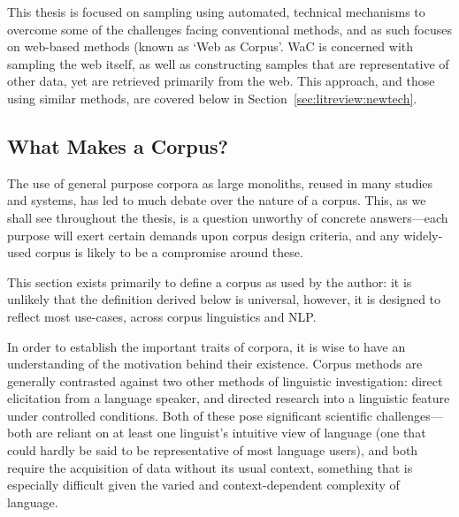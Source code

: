 
This thesis is focused on sampling using automated, technical mechanisms to overcome some of the challenges facing conventional methods, and as such focuses on web-based methods (known as `Web as Corpus'.  WaC is concerned with sampling the web itself, as well as constructing samples that are representative of other data, yet are retrieved primarily from the web.  This approach, and those using similar methods, are covered below in Section~\ref{sec:litreview:newtech}.






















\subsection{What Makes a Corpus?}
The use of general purpose corpora as large monoliths, reused in many studies and systems, has led to much debate over the nature of a corpus.  This, as we shall see throughout the thesis, is a question unworthy of concrete answers---each purpose will exert certain demands upon corpus design criteria, and any widely-used corpus is likely to be a compromise around these.

This section exists primarily to define a corpus as used by the author: it is unlikely that the definition derived below is universal, however, it is designed to reflect most use-cases, across corpus linguistics and NLP.




In order to establish the important traits of corpora, it is wise to have an understanding of the motivation behind their existence.  Corpus methods are generally contrasted against two other methods of linguistic investigation: direct elicitation from a language speaker, and directed research into a linguistic feature under controlled conditions.  Both of these pose significant scientific challenges---both are reliant on at least one linguist's intuitive view of language (one that could hardly be said to be representative of most language users), and both require the acquisition of data without its usual context, something that is especially difficult given the varied and context-dependent complexity of language.

